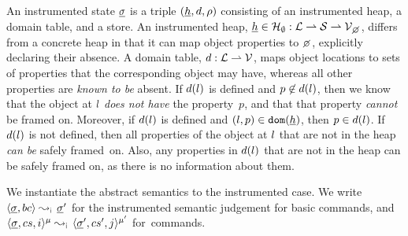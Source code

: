 An instrumented state $\underline{\sigma}$ is a triple $(\underline{h}, d, \rho)$ consisting of an instrumented heap, 
a domain table, and a store. 
%
An instrumented heap, $\iheap \in \iheaps : \locs \partialmap \strings \partialmap \setext{\vals}{\none}$, 
differs from a concrete heap in that it can map object properties to $\none$, explicitly declaring their absence. 
%
A domain table, $d : {\mathcal L} \rightharpoonup \mathcal{V}$, maps object locations to sets of properties that the corresponding object may have, whereas all other properties are \emph{known to be} absent. 
If $d(l)$ is defined and $p \not\in d(l)$, then we know that the object at $l$ \emph{does not have} the property~$p$, and that that property \emph{cannot} be framed on. 
Moreover, if $d(l)$ is defined and $(l, p) \in \texttt{dom}(\underline{h})$, then $p \in d(l)$.
If $d(l)$ is not defined, then all properties of the object at $l$ that are not in the heap \emph{can be} safely framed~on. Also, any properties in $d(l)$ that are not in the heap can be safely framed on, as there is no information about them.


We instantiate the abstract semantics to the instrumented case. 
We write $\absbsemrule{\istate, \bcmd}{\istate'}{\instrumented}$ for the instrumented semantic 
judgement for basic commands, and $\abssemrule{\istate, \cs, i}{\istate', \cs', j}{\mode}{\mode'}{\instrumented}$ 
for~commands. 

